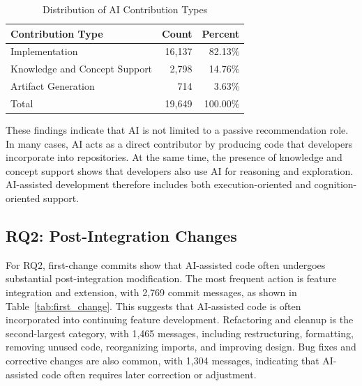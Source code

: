 \documentclass[12pt,draftclsnofoot,onecolumn]{IEEEtran}
\begin{document}
\begin{table}[!t]
\caption{Distribution of AI Contribution Types}
\label{tab:contribution_distribution}
\centering
\small
\begin{tabularx}{0.86\linewidth}{Xrr}
\toprule
\textbf{Contribution Type} & \textbf{Count} & \textbf{Percent} \\
\midrule
Implementation & 16,137 & 82.13\% \\
Knowledge and Concept Support & 2,798 & 14.76\% \\
Artifact Generation & 714 & 3.63\% \\
\midrule
Total & 19,649 & 100.00\% \\
\bottomrule
\end{tabularx}
\end{table}

These findings indicate that AI is not limited to a passive recommendation role. In many cases, AI acts as a direct contributor by producing code that developers incorporate into repositories. At the same time, the presence of knowledge and concept support shows that developers also use AI for reasoning and exploration. AI-assisted development therefore includes both execution-oriented and cognition-oriented support.

\subsection{RQ2: Post-Integration Changes}

For RQ2, first-change commits show that AI-assisted code often undergoes substantial post-integration modification. The most frequent action is feature integration and extension, with 2,769 commit messages, as shown in Table~\ref{tab:first_change}. This suggests that AI-assisted code is often incorporated into continuing feature development. Refactoring and cleanup is the second-largest category, with 1,465 messages, including restructuring, formatting, removing unused code, reorganizing imports, and improving design. Bug fixes and corrective changes are also common, with 1,304 messages, indicating that AI-assisted code often requires later correction or adjustment.
\end{document}
